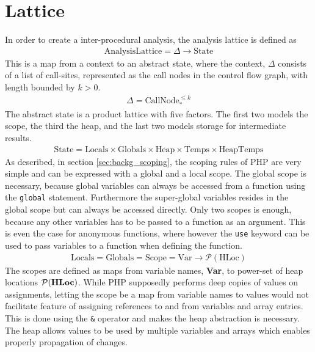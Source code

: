 
\section{Lattice}
In order to create a inter-procedural analysis, the analysis lattice is defined as
\begin{align}
\text{AnalysisLattice} = \Delta \rightarrow \text{State}
\end{align}
This is a map from a context to an abstract state, where the context, $\Delta$ consists of a list of call-sites, represented as the call nodes in the control flow graph, with length bounded by $k>0$. 
\begin{align}
\Delta = \text{CallNode}_*^{\leq k}
\end{align}
The abstract state is a product lattice with five factors. The first two models the scope, the third the heap, and the last two models storage for intermediate results. 
\begin{align}
\text{State} = \text{Locals} \times \text{Globals} \times \text{Heap} \times \text{Temps} \times \text{HeapTemps} 
\end{align}
As described, in section \ref{sec:backg_scoping}, the scoping rules of PHP are very simple and can be expressed with a global and a local scope. The global scope is necessary, because global variables can always be accessed from a function using the \texttt{global} statement. Furthermore the super-global variables resides in the global scope but can always be accessed directly. Only two scopes is enough, because any other variables has to be passed to a function as an argument. This is even the case for anonymous functions, where however the \texttt{use} keyword can be used to pass variables to a function when defining the function.
\begin{align}
\text{Locals} = \text{Globals} = \text{Scope} = \text{Var} \rightarrow \mathcal{P}(\text{HLoc})
\end{align}
The scopes are defined as maps from variable names, {\bf Var}, to power-set of heap locations $\mathcal{P}(\text{\bf HLoc})$. While PHP supposedly performs deep copies of values on assignments, letting the scope be a map from variable names to values would not facilitate feature of assigning references to and from variables and array entries. This is done using the \texttt{\&} operator and makes the heap abstraction is necessary. The heap allows values to be used by multiple variables and arrays which enables properly propagation of changes. 
